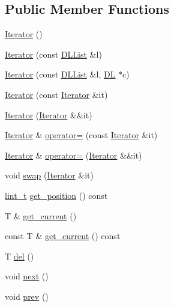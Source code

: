 \subsection*{Public Member Functions}
\begin{DoxyCompactItemize}
\item 
\hyperlink{class_designar_1_1_d_l_list_1_1_iterator_a2d2ee7eeaa63b3b2e051a76fb4c4e164}{Iterator} ()
\item 
\hyperlink{class_designar_1_1_d_l_list_1_1_iterator_a7e1757caeeef81f003526fda985664cb}{Iterator} (const \hyperlink{class_designar_1_1_d_l_list}{D\+L\+List} \&l)
\item 
\hyperlink{class_designar_1_1_d_l_list_1_1_iterator_a41bf428b6219be3f152460de103f4413}{Iterator} (const \hyperlink{class_designar_1_1_d_l_list}{D\+L\+List} \&l, \hyperlink{class_designar_1_1_d_l}{DL} $\ast$c)
\item 
\hyperlink{class_designar_1_1_d_l_list_1_1_iterator_a824a391fc47274867bffac143a3d740b}{Iterator} (const \hyperlink{class_designar_1_1_d_l_list_1_1_iterator}{Iterator} \&it)
\item 
\hyperlink{class_designar_1_1_d_l_list_1_1_iterator_ad6d70cfea31c61502831f20b87d4f56f}{Iterator} (\hyperlink{class_designar_1_1_d_l_list_1_1_iterator}{Iterator} \&\&it)
\item 
\hyperlink{class_designar_1_1_d_l_list_1_1_iterator}{Iterator} \& \hyperlink{class_designar_1_1_d_l_list_1_1_iterator_a292588690dcaa7acc2311a92e535424e}{operator=} (const \hyperlink{class_designar_1_1_d_l_list_1_1_iterator}{Iterator} \&it)
\item 
\hyperlink{class_designar_1_1_d_l_list_1_1_iterator}{Iterator} \& \hyperlink{class_designar_1_1_d_l_list_1_1_iterator_a92bdff852753fecd794b5691419858a8}{operator=} (\hyperlink{class_designar_1_1_d_l_list_1_1_iterator}{Iterator} \&\&it)
\item 
void \hyperlink{class_designar_1_1_d_l_list_1_1_iterator_afb6abdec64f67b81813441a4c7d133d1}{swap} (\hyperlink{class_designar_1_1_d_l_list_1_1_iterator}{Iterator} \&it)
\item 
\hyperlink{namespace_designar_a9d113d66a39e82b73727c72cd3a52f73}{lint\+\_\+t} \hyperlink{class_designar_1_1_d_l_list_1_1_iterator_acf69183ba9dedd6fdb7dee8854cfce17}{get\+\_\+position} () const
\item 
T \& \hyperlink{class_designar_1_1_d_l_list_1_1_iterator_ad724b6e244dcd79d58b5772083e853ef}{get\+\_\+current} ()
\item 
const T \& \hyperlink{class_designar_1_1_d_l_list_1_1_iterator_a337833cfd046d1b1e69e9af95bdc3280}{get\+\_\+current} () const
\item 
T \hyperlink{class_designar_1_1_d_l_list_1_1_iterator_a98644b925b49ea22a9552039abb2624d}{del} ()
\item 
void \hyperlink{class_designar_1_1_d_l_list_1_1_iterator_ac4eb0645c0e4e68057bf0bc05cf3c8c3}{next} ()
\item 
void \hyperlink{class_designar_1_1_d_l_list_1_1_iterator_ac713eeea83e3e32a939067614a13c41d}{prev} ()
\end{DoxyCompactItemize}

